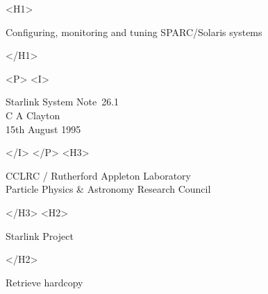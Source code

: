 \documentclass[11pt]{article}
\newcommand{\stardoccategory}  {Starlink System Note}
\newcommand{\stardocnumber}    {26.1}
\newcommand{\stardocsource}    {ssn\stardocnumber}
\newcommand{\stardocauthors}   {C A Clayton}
\newcommand{\stardocdate}      {15th August 1995}
\newcommand{\stardoctitle}     {Configuring, monitoring and tuning SPARC/Solaris systems}
\newcommand{\htmladdnormallink}[2]{#1}
\newcommand{\htmladdimg}[1]{}
\newcommand{\htmlref}[2]{#1}
\newcommand{\htmladdtonavigation}[1]{}
\newcommand{\xlabel}[1]{}
\begin{document}
\begin{htmlonly}
   \xlabel{}
   \begin{rawhtml} <H1> \end{rawhtml}
      \stardoctitle
   \begin{rawhtml} </H1> \end{rawhtml}


   \begin{rawhtml} <P> <I> \end{rawhtml}
   \stardoccategory\ \stardocnumber \\
   \stardocauthors \\
   \stardocdate
   \begin{rawhtml} </I> </P> <H3> \end{rawhtml}
      \htmladdnormallink{CCLRC}{http://www.cclrc.ac.uk} /
      \htmladdnormallink{Rutherford Appleton Laboratory}
                        {http://www.cclrc.ac.uk/ral} \\
      Particle Physics \& Astronomy Research Council \\
   \begin{rawhtml} </H3> <H2> \end{rawhtml}
      \htmladdnormallink{Starlink Project}{http://star-www.rl.ac.uk/}
   \begin{rawhtml} </H2> \end{rawhtml}
   \htmladdnormallink{\htmladdimg{source.gif} Retrieve hardcopy}
      {http://star-www.rl.ac.uk/cgi-bin/hcserver?\stardocsource}\\



\end{htmlonly}
\end{document}

